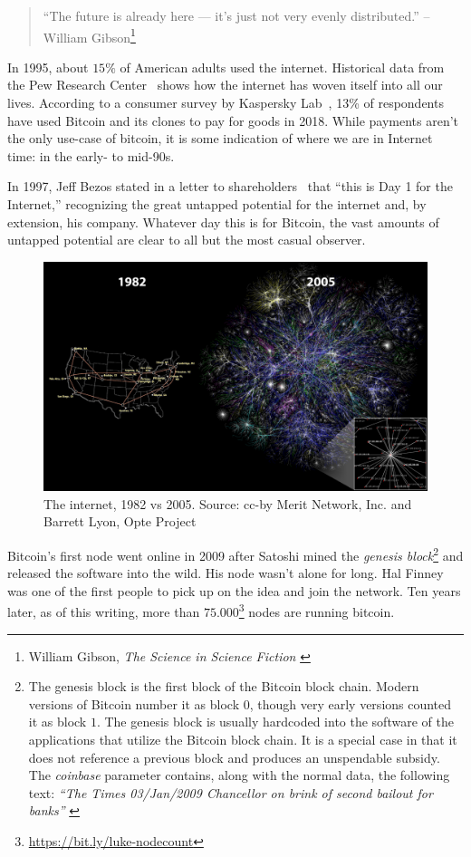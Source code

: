 \begin{quotation}
``The future is already here --- it's just not very evenly
distributed.''
\flushright -- William Gibson\footnote{William Gibson, \textit{The Science in Science Fiction} \cite{william-gibson}}
\end{quotation}

In 1995, about $15\%$ of American adults used the internet. Historical
data from the Pew Research Center~\cite{pew-research} shows how the internet has woven
itself into all our lives. According to a consumer survey by Kaspersky
Lab~\cite{web:kaspersky}, 13\% of respondents have used Bitcoin and its clones to pay for
goods in 2018. While payments aren't the only use-case of bitcoin, it is
some indication of where we are in Internet time: in the early- to
mid-90s.

In 1997, Jeff Bezos stated in a letter to shareholders~\cite{bezos-letter} that
\enquote{this is Day 1 for the Internet,} recognizing the great untapped
potential for the internet and, by extension, his company. Whatever day this is
for Bitcoin, the vast amounts of untapped potential are clear to all but the
most casual observer.

\begin{figure}
  \includegraphics{assets/images/internet-evolution-black-dates.png}
  \caption{The internet, 1982 vs 2005. Source: cc-by Merit Network, Inc. and Barrett Lyon, Opte Project}
  \label{fig:internet-evolution-black-dates}
\end{figure}

Bitcoin's first node went online in 2009 after Satoshi mined the \textit{genesis
block}\footnote{The genesis block is the first block of the Bitcoin block chain.
Modern versions of Bitcoin number it as block $0$, though very early versions
counted it as block $1$. The genesis block is usually hardcoded into the
software of the applications that utilize the Bitcoin block chain. It is a
special case in that it does not reference a previous block and produces an
unspendable subsidy. The \textit{coinbase} parameter contains, along with the
normal data, the following text: \textit{\enquote{The Times 03/Jan/2009 Chancellor on
brink of second bailout for banks}} \cite{btcwiki:genesis-block}} and released
the software into the wild. His node wasn't alone for long. Hal Finney was one
of the first people to pick up on the idea and join the network. Ten years
later, as of this writing, more than
$75.000$\footnote{\url{https://bit.ly/luke-nodecount}} nodes are running
bitcoin.

